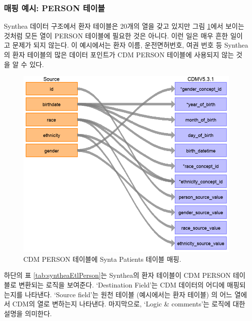\documentclass[11pt]{book}
\theoremstyle{definition}
\theoremstyle{definition}
\theoremstyle{definition}
\theoremstyle{remark}
\begin{document}
\subsubsection*{매핑 예시: PERSON 테이블}\label{--person-}

Synthea 데이터 구조에서 환자 테이블은 20개의 열을 갖고 있지만 그림
\ref{fig:syntheaPerson}에서 보이는 것처럼 모든 열이 PERSON 테이블에
필요한 것은 아니다. 이런 일은 매우 흔한 일이고 문제가 되지 않는다. 이
예시에서는 환자 이름, 운전면허번호, 여권 번호 등 Synthea의 환자 테이블의
많은 데이터 포인트가 CDM PERSON 테이블에 사용되지 않는 것을 알 수 있다.

\begin{figure}

{\centering \includegraphics[width=1\linewidth]{images/ExtractTransformLoad/syntheaPersonTable} 

}

\caption{CDM PERSON 테이블에 Synta Patients 테이블 매핑.}\label{fig:syntheaPerson}
\end{figure}

하단의 표 \ref{tab:syntheaEtlPerson}는 Synthea의 환자 테이블이 CDM
PERSON 테이블로 변환되는 로직을 보여준다. `Destination Field'는 CDM
데이터의 어디에 매핑되는지를 나타낸다. `Source field'는 원천 테이블
(예시에서는 환자 테이블) 의 어느 열에서 CDM의 열로 변하는지 나타낸다.
마지막으로, `Logic \& comments'는 로직에 대한 설명을 의미한다.
\end{document}
